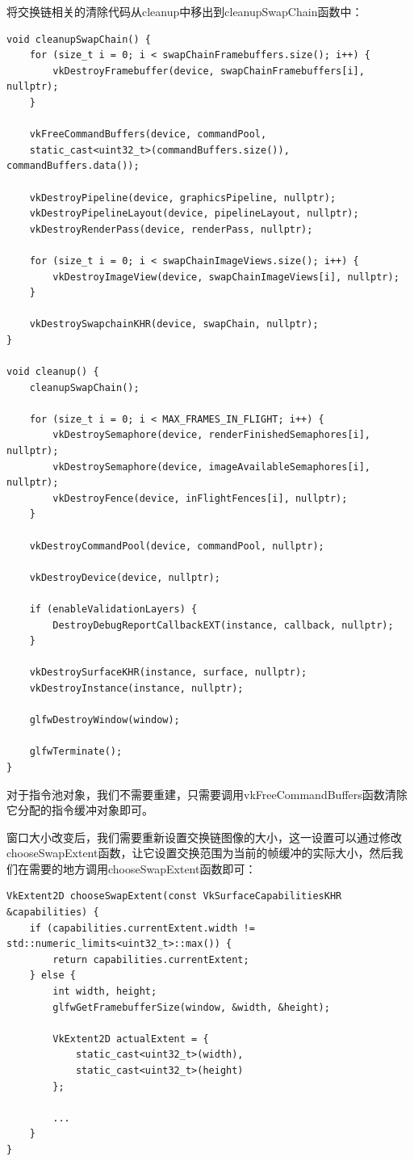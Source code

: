 \documentclass{ctexart}
\begin{document}
将交换链相关的清除代码从cleanup中移出到cleanupSwapChain函数中：

\begin{lstlisting}[language={[ANSI]C}]
void cleanupSwapChain() {
	for (size_t i = 0; i < swapChainFramebuffers.size(); i++) {
		vkDestroyFramebuffer(device, swapChainFramebuffers[i], nullptr);
	}

	vkFreeCommandBuffers(device, commandPool,
	static_cast<uint32_t>(commandBuffers.size()), commandBuffers.data());

	vkDestroyPipeline(device, graphicsPipeline, nullptr);
	vkDestroyPipelineLayout(device, pipelineLayout, nullptr);
	vkDestroyRenderPass(device, renderPass, nullptr);

	for (size_t i = 0; i < swapChainImageViews.size(); i++) {
		vkDestroyImageView(device, swapChainImageViews[i], nullptr);
	}

	vkDestroySwapchainKHR(device, swapChain, nullptr);
}

void cleanup() {
	cleanupSwapChain();

	for (size_t i = 0; i < MAX_FRAMES_IN_FLIGHT; i++) {
		vkDestroySemaphore(device, renderFinishedSemaphores[i], nullptr);
		vkDestroySemaphore(device, imageAvailableSemaphores[i], nullptr);
		vkDestroyFence(device, inFlightFences[i], nullptr);
	}

	vkDestroyCommandPool(device, commandPool, nullptr);

	vkDestroyDevice(device, nullptr);

	if (enableValidationLayers) {
		DestroyDebugReportCallbackEXT(instance, callback, nullptr);
	}

	vkDestroySurfaceKHR(instance, surface, nullptr);
	vkDestroyInstance(instance, nullptr);

	glfwDestroyWindow(window);

	glfwTerminate();
}
\end{lstlisting}

对于指令池对象，我们不需要重建，只需要调用vkFreeCommandBuffers函数清除它分配的指令缓冲对象即可。

窗口大小改变后，我们需要重新设置交换链图像的大小，这一设置可以通过修改chooseSwapExtent函数，让它设置交换范围为当前的帧缓冲的实际大小，然后我们在需要的地方调用chooseSwapExtent函数即可：

\begin{lstlisting}[language={[ANSI]C}]
VkExtent2D chooseSwapExtent(const VkSurfaceCapabilitiesKHR &capabilities) {
	if (capabilities.currentExtent.width != std::numeric_limits<uint32_t>::max()) {
		return capabilities.currentExtent;
	} else {
		int width, height;
		glfwGetFramebufferSize(window, &width, &height);

		VkExtent2D actualExtent = {
			static_cast<uint32_t>(width),
			static_cast<uint32_t>(height)
		};

		...
	}
}
\end{lstlisting}
\end{document}
